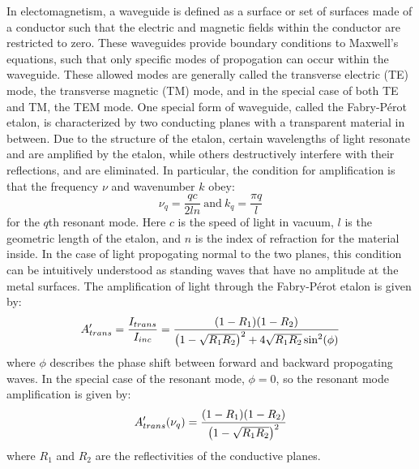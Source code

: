 \documentclass{report}
\begin{document}
        In electomagnetism, a waveguide is defined as a surface or set of surfaces made of a conductor such that the electric and magnetic fields within the conductor are restricted to zero. These waveguides provide boundary conditions to Maxwell's equations, such that only specific modes of propogation can occur within the waveguide. These allowed modes are generally called the transverse electric (TE) mode, the transverse magnetic (TM) mode, and in the special case of both TE and TM, the TEM mode\cite{griffiths1999}. One special form of waveguide, called the Fabry-P\'erot etalon, is characterized by two conducting planes with a transparent material in between. Due to the structure of the etalon, certain wavelengths of light resonate and are amplified by the etalon, while others destructively interfere with their reflections, and are eliminated\cite{Ismail2016}. In particular, the condition for amplification is that the frequency $\nu$ and wavenumber $k$ obey:
        \begin{equation}
            \nu_q=\frac{qc}{2ln}\ \mathrm{and}\ k_q=\frac{\pi q}{l}
        \end{equation}
        for the $q$th resonant mode. Here $c$ is the speed of light in vacuum, $l$ is the geometric length of the etalon, and $n$ is the index of refraction for the material inside\cite{Pollnau2018}. In the case of light propogating normal to the two planes, this condition can be intuitively understood as standing waves that have no amplitude at the metal surfaces. The amplification of light through the Fabry-P\'erot etalon is given by:
        \begin{equation}
            A'_{trans}=\frac{I_{trans}}{I_{inc}}=\frac{\qty(1-R_1)\qty(1-R_2)}{\qty(1-\sqrt{R_1R_2})^2+4\sqrt{R_1R_2}\sin^2(\phi)}
        \end{equation}
        where $\phi$ describes the phase shift between forward and backward propogating waves. In the special case of the resonant mode, $\phi=0$, so the resonant mode amplification is given by:
        \begin{equation}
            A'_{trans}\qty(\nu_q)=\frac{\qty(1-R_1)\qty(1-R_2)}{\qty(1-\sqrt{R_1R_2})^2}
        \end{equation}
        where $R_1$ and $R_2$ are the reflectivities of the conductive planes\cite{siegman1986}.
        
\end{document}
